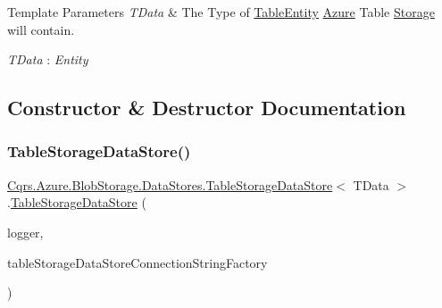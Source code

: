 \begin{DoxyTemplParams}{Template Parameters}
{\em T\+Data} & The Type of \hyperlink{classCqrs_1_1Azure_1_1BlobStorage_1_1TableEntity}{Table\+Entity} \hyperlink{namespaceCqrs_1_1Azure}{Azure} Table \hyperlink{namespaceCqrs_1_1Azure_1_1Storage}{Storage} will contain.\\
\hline
\end{DoxyTemplParams}
\begin{Desc}
\item[Type Constraints]\begin{description}
\item[{\em T\+Data} : {\em Entity}]\end{description}
\end{Desc}


\subsection{Constructor \& Destructor Documentation}
\mbox{\label{classCqrs_1_1Azure_1_1BlobStorage_1_1DataStores_1_1TableStorageDataStore_a29c0fb07b5b5e6655a24cc831484646a_a29c0fb07b5b5e6655a24cc831484646a}} 
\subsubsection{\texorpdfstring{Table\+Storage\+Data\+Store()}{TableStorageDataStore()}}
{\footnotesize\ttfamily \hyperlink{classCqrs_1_1Azure_1_1BlobStorage_1_1DataStores_1_1TableStorageDataStore}{Cqrs.\+Azure.\+Blob\+Storage.\+Data\+Stores.\+Table\+Storage\+Data\+Store}$<$ T\+Data $>$.\hyperlink{classCqrs_1_1Azure_1_1BlobStorage_1_1DataStores_1_1TableStorageDataStore}{Table\+Storage\+Data\+Store} (\begin{DoxyParamCaption}\item[{I\+Logger}]{logger,  }\item[{\hyperlink{interfaceCqrs_1_1Azure_1_1BlobStorage_1_1DataStores_1_1ITableStorageDataStoreConnectionStringFactory}{I\+Table\+Storage\+Data\+Store\+Connection\+String\+Factory}}]{table\+Storage\+Data\+Store\+Connection\+String\+Factory }\end{DoxyParamCaption})}



